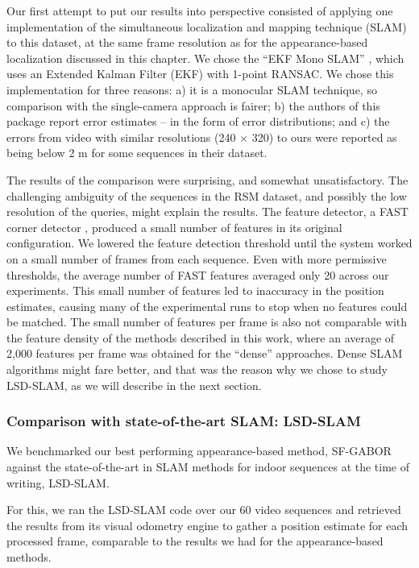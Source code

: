 Our first attempt to put our results into perspective consisted of applying one implementation of the simultaneous localization and mapping technique (SLAM) to this dataset, at the same frame resolution as for the appearance-based  localization discussed in this chapter. We chose the ``EKF Mono SLAM'' \citep{Civera}, which uses an Extended Kalman Filter (EKF) with 1-point RANSAC.  We chose this implementation for three reasons: a) it is a monocular SLAM technique, so comparison with the single-camera approach is fairer; b) the authors of this package report error estimates -- in the form of error distributions; and c) the errors from video with similar resolutions (240 $\times$ 320) to ours were reported as being below 2 m for some sequences \citep{Civera} in their dataset.

The results of the comparison were surprising, and somewhat unsatisfactory. The challenging ambiguity of the sequences in the RSM dataset, and possibly the low resolution of the queries, might explain the results. The feature detector, a FAST corner detector \citep{rosten_2006_machine}, produced a small number of features in its original  configuration. We lowered the feature detection threshold until the system worked on a small number of frames from each sequence. Even with more permissive thresholds, the average number of FAST features averaged only 20 across our experiments. This small number of features led to inaccuracy in the position estimates, causing many of the experimental runs to stop when no features could be matched. The small number of features per frame is also not comparable with the feature density of the methods described in this work, where an average of 2,000 features per frame was obtained for the ``dense'' approaches. Dense SLAM algorithms might fare better, and that was the reason why we chose to study LSD-SLAM, as we will describe in the next section.

\subsubsection{Comparison with state-of-the-art SLAM: LSD-SLAM}
\label{sec:comparisonSLAM}

We benchmarked our best performing appearance-based method, SF-GABOR against the state-of-the-art in SLAM methods for indoor sequences at the time of writing, LSD-SLAM.

For this, we ran the LSD-SLAM code over our 60 video sequences and retrieved the results from its visual odometry engine to gather a position estimate for each processed frame, comparable to the results we had for the appearance-based methods. 

